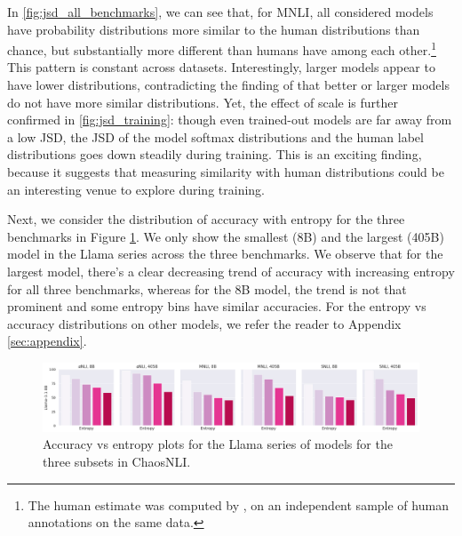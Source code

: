 In \cref{fig:jsd_all_benchmarks}, we can see that, for MNLI, all considered models have probability distributions more similar to the human distributions than chance, but substantially more different than humans have among each other.\footnote{The human estimate was computed by \citet{nie-etal-2020-learn}, on an independent sample of human annotations on the same data.}
This pattern is constant across datasets. 
Interestingly, larger models appear to have lower distributions, contradicting the finding of \citet{nie-etal-2020-learn} that better or larger models do not have more similar distributions.
Yet, the effect of scale is further confirmed in \cref{fig:jsd_training}: though even trained-out models are far away from a low JSD, the JSD of the model softmax distributions and the human label distributions goes down steadily during training.
This is an exciting finding, because it suggests that measuring similarity with human distributions could be an interesting venue to explore during training.

Next, we consider the distribution of accuracy with entropy for the three benchmarks in Figure \ref{fig:entropy_accuracy}. We only show the smallest (8B) and the largest (405B) model in the Llama series across the three benchmarks. We observe that for the largest model, there's a clear decreasing trend of accuracy with increasing entropy for all three benchmarks, whereas for the 8B model, the trend is not that prominent and some entropy bins have similar accuracies. For the entropy vs accuracy distributions on other models, we refer the reader to Appendix \ref{sec:appendix}.

\begin{figure}[t]
    \centering
    \includegraphics[width=0.95\linewidth]{figures/entropy_acc_8_405}
    \caption{Accuracy vs entropy plots for the Llama series of models for the three subsets in ChaosNLI.}
    \label{fig:entropy_accuracy}
\end{figure}
% 
